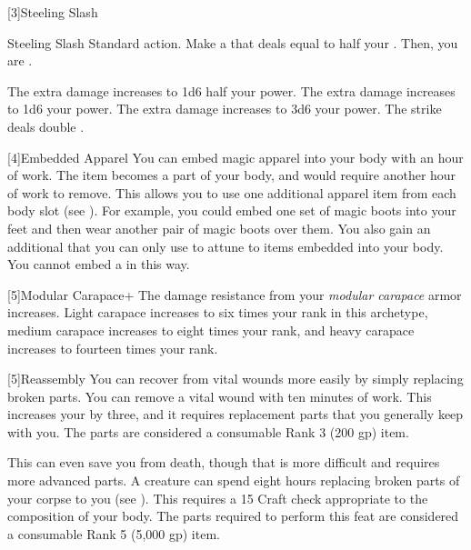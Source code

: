     [3]{Steeling Slash}
    \begin{activeability}{Steeling Slash}
        \abilityusagetime Standard action.
        \rankline
        Make a  that deals  equal to half your .
        Then, you are  \steeled.

        \rankline
         The extra damage increases to 1d6 \add half your power.
         The extra damage increases to 1d6 \add your power.
         The extra damage increases to 3d6 \add your power.
         The strike deals double .
    \end{activeability}

    [4]{Embedded Apparel} You can embed magic apparel into your body with an hour of work.
      The item becomes a part of your body, and would require another hour of work to remove.
      This allows you to use one additional apparel item from each body slot (see ).
      For example, you could embed one set of magic boots into your feet and then wear another pair of magic boots over them.
      You also gain an additional  that you can only use to attune to items embedded into your body.
      You cannot embed a  in this way.

    [5]{Modular Carapace+} The damage resistance from your \textit{modular carapace} armor increases.
      Light carapace increases to six times your rank in this archetype, medium carapace increases to eight times your rank, and heavy carapace increases to fourteen times your rank.

    [5]{Reassembly} You can recover from vital wounds more easily by simply replacing broken parts.
      You can remove a vital wound with ten minutes of work.
      This increases your  by three, and it requires replacement parts that you generally keep with you.
      The parts are considered a consumable Rank 3 (200 gp) item.

      This can even save you from death, though that is more difficult and requires more advanced parts.
      A creature can spend eight hours replacing broken parts of your corpse to  you (see ).
      This requires a  15 Craft check appropriate to the composition of your body.
      The parts required to perform this feat are considered a consumable Rank 5 (5,000 gp) item.

